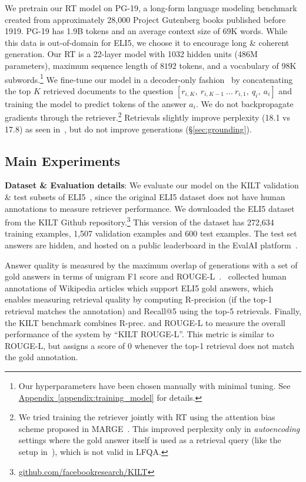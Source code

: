 \documentclass[11pt]{article}
\newcommand{\namedref}[2]{\hyperref[#2]{#1~\ref*{#2}}}
\newcommand{\appendixref}[1]{\namedref{Appendix}{#1}}
\begin{document}
We pretrain our RT model on PG-19, a long-form language
modeling benchmark~\citep{rae2020compressive} created from approximately 28,000 Project Gutenberg books published before 1919. PG-19 has 1.9B tokens and an average context size of 69K words. While this data is out-of-domain for ELI5, we choose it to encourage long \& coherent generation. Our RT is a 22-layer model with 1032 hidden units (486M parameters), maximum sequence length of \(8192\) tokens, and a vocabulary of 98K subwords.\footnote{Our hyperparameters have been chosen manually with minimal tuning. See \appendixref{appendix:training_model} for details.}
We fine-tune our model in a decoder-only 
fashion~\citep{liu2018generating, wolf2019transfertransfo} by concatenating the top $K$ retrieved documents to the question
$[r_{i,K},~r_{i,K-1}~...~r_{i,1},~q_i,~a_i]$ and training the model to predict tokens of the answer $a_i$. We do not backpropagate gradients through the 
retriever.\footnote{We tried training the retriever jointly with RT using the attention bias scheme proposed in MARGE~\citep{lewis2020pre}. This 
improved perplexity only in \textit{autoencoding} settings where the gold answer itself is used as 
a retrieval query (like the setup in~\citealp{lewis2020pre}), which is not valid in LFQA.} Retrievals slightly improve perplexity (18.1 vs 17.8) as seen in~\citet{wang2020fly}, but do not improve generations (\S \ref{sec:grounding}).


 \subsection{Main Experiments}
\label{sec:experiments}


\noindent \textbf{Dataset \& Evaluation details}: We evaluate our model on the KILT validation \& test subsets of ELI5~\citep{petroni2020kilt}, since the original ELI5 dataset does not have human annotations to measure retriever performance. We downloaded the ELI5 dataset~\citep{fan-etal-2019-eli5} from the KILT Github repository.\footnote{\url{github.com/facebookresearch/KILT}} This version of the dataset has 272,634 training examples, 1,507 validation examples and 600 test examples. The test set answers are hidden, and hosted on a public leaderboard in the EvalAI platform~\citep{EvalAI}.

Answer quality is measured by the maximum overlap of generations with a set of gold answers in terms of unigram F1 score and ROUGE-L~\citep{lin-2004-rouge}.~\citet{petroni2020kilt} collected human annotations of Wikipedia articles which support 
ELI5 gold answers, which enables measuring retrieval quality by computing R-precision (if
the top-1 retrieval matches the annotation) and Recall@5 using the top-5 
retrievals. Finally, the KILT benchmark combines R-prec. and 
ROUGE-L to measure the overall performance of the system by ``KILT ROUGE-L''. This metric is similar to ROUGE-L, but assigns a score of 0 whenever the top-1 retrieval does not match the gold annotation.\\
\end{document}
